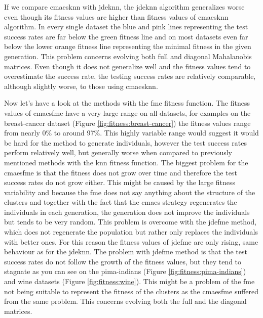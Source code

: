 \documentclass[12pt,a4paper]{report}
\begin{document}
If we compare \ac{cmaesknn} with \ac{jdeknn}, the \ac{jdeknn} algorithm generalizes worse even though its fitness values are higher than fitness values of \ac{cmaesknn} algorithm. In every single dataset the blue and pink lines representing the test success rates are far below the green fitness line and on most datasets even far below the lower orange fitness line representing the minimal fitness in the given generation. This problem concerns evolving both full and diagonal Mahalanobis matrices. Even though it does not generalize well and the fitness values tend to overestimate the success rate, the testing success rates are relatively comparable, although slightly worse, to those using \ac{cmaesknn}.

Now let's have a look at the methods with the \ac{fme} fitness function. The fitness values of \ac{cmaesfme} have a very large range on all datasets, for examples on the breast-cancer dataset (Figure \ref{fig:fitness:breast-cancer}) the fitness values range from nearly 0\% to around 97\%. This highly variable range would suggest it would be hard for the method to generate individuals, however the test success rates perform relatively well, but generally worse when compared to previously mentioned methods with the \ac{knn} fitness function. The biggest problem for the \ac{cmaesfme} is that the fitness does not grow over time and therefore the test success rates do not grow either. This might be caused by the large fitness variability and because the \ac{fme} does not say anything about the structure of the clusters and together with the fact that the \ac{cmaes} strategy regenerates the individuals in each generation, the generation does not improve the individuals but tends to be very random. This problem is overcome with the \ac{jdefme} method, which does not regenerate the population but rather only replaces the individuals with better ones. For this reason the fitness values of \ac{jdefme} are only rising, same behaviour as for the \ac{jdeknn}. The problem with \ac{jdefme} method is that the test success rates do not follow the growth of the fitness values, but they tend to stagnate as you can see on the pima-indians (Figure \ref{fig:fitness:pima-indians}) and wine datasets (Figure \ref{fig:fitness:wine}). This might be a problem of the \ac{fme} not being suitable to represent the fitness of the clusters as the \ac{cmaesfme} suffered from the same problem. This concerns evolving both the full and the diagonal matrices.
\end{document}
